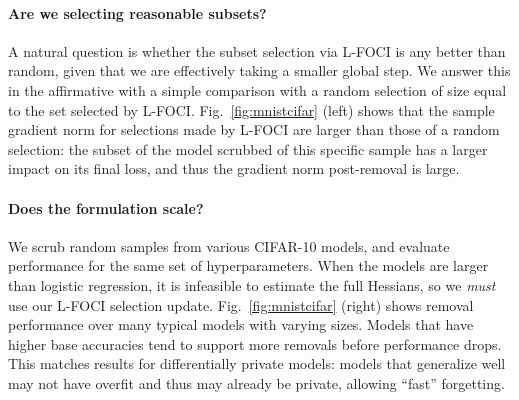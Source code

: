 \paragraph{Are we selecting reasonable subsets?} A natural question is whether the subset selection via L-FOCI is any better than random, given that we are effectively taking a smaller global step. We answer this in the affirmative with a simple comparison with a random selection of size equal to the set selected by L-FOCI. Fig.~\ref{fig:mnistcifar} (left) shows that the sample gradient norm for selections made by L-FOCI are larger than those of a random selection: the subset of the model scrubbed of this specific sample has a larger impact on its final loss, and thus the gradient norm post-removal is large.




\paragraph{Does the formulation scale?} We scrub random samples from various CIFAR-10 models, and evaluate  performance for the same set of hyperparameters. When the models are larger than logistic regression, it is infeasible to estimate the full Hessians, so 
we {\em must} use our L-FOCI selection update. Fig.~\ref{fig:mnistcifar} (right) shows removal performance over many typical models with varying sizes. Models that have higher base accuracies tend to support more removals before performance drops. This matches results for differentially private models: models that generalize well may not have overfit and thus may already be private, allowing ``fast'' forgetting.

